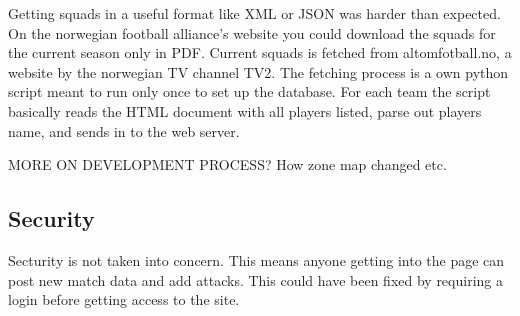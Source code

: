 Getting squads in a useful format like XML or JSON was harder than expected. On the norwegian football alliance's website you could download the squads for the current season only in PDF. Current squads is fetched from altomfotball.no, a website by the norwegian TV channel TV2. The fetching process is a own python script meant to run only once to set up the database. For each team the script basically reads the HTML document with all players listed, parse out players name, and sends in to the web server.

MORE ON DEVELOPMENT PROCESS? How zone map changed etc. 


\subsection{Security}
Secturity is not taken into concern. This means anyone getting into the page can post new match data and add attacks. This could have been fixed by requiring a login before getting access to the site. 

